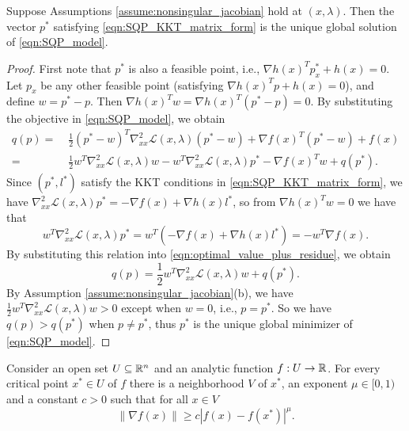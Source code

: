 \documentclass[11pt,a4paper]{article}
\begin{document}
\begin{prop}\label{prop:uniqueness_QP}
Suppose Assumptions \ref{assume:nonsingular_jacobian} hold at $(x,\lambda)$. Then the vector $p^*$ satisfying \eqref{eqn:SQP_KKT_matrix_form} is the unique global solution of \eqref{eqn:SQP_model}.
\end{prop}

\begin{proof}
First note that $p^*$ is also a feasible point, i.e., $\nabla h(x)^Tp^*_x + h(x) = 0$. Let $p_x$ be any other feasible point (satisfying $\nabla h(x)^Tp + h(x) = 0$), and define $w = p^*-p$. Then $\nabla h(x)^Tw = \nabla h(x)^T(p^*-p) = 0$. By substituting the objective in \eqref{eqn:SQP_model}, we obtain
\begin{align}
q(p) =&\; \frac{1}{2}(p^*-w)^T\nabla_{xx}^2\mathcal{L}(x,\lambda)(p^*-w)+\nabla f(x)^T(p^*-w)+f(x)\nonumber \\
=&\; \frac{1}{2}w^T\nabla_{xx}^2\mathcal{L}(x,\lambda)w - w^T\nabla_{xx}^2\mathcal{L}(x,\lambda)p^* - \nabla f(x)^Tw + q(p^*).\label{eqn:optimal_value_plus_residue}
\end{align}
Since $(p^*,l^*)$ satisfy the KKT conditions in \eqref{eqn:SQP_KKT_matrix_form}, we have $\nabla_{xx}^2\mathcal{L}(x,\lambda)p^* = -\nabla f(x)+\nabla h(x)l^*$, so from $\nabla h(x)^Tw = 0$ we have that
\begin{equation*}
w^T\nabla_{xx}^2\mathcal{L}(x,\lambda)p^* = w^T(-\nabla f(x)+\nabla h(x)l^*) = -w^T\nabla f(x).
\end{equation*}
By substituting this relation into \eqref{eqn:optimal_value_plus_residue}, we obtain
\begin{equation*}
q(p) = \frac{1}{2}w^T\nabla_{xx}^2\mathcal{L}(x,\lambda)w + q(p^*).
\end{equation*}
By Assumption \ref{assume:nonsingular_jacobian}(b), we have $\frac{1}{2}w^T\nabla_{xx}^2\mathcal{L}(x,\lambda)w>0$ except when $w = 0$, i.e., $p = p^*$. So we have $q(p)>q(p^*)$ when $p\neq p^*$, thus $p^*$ is the unique global minimizer of \eqref{eqn:SQP_model}.
\end{proof}

\begin{prop} \label{prop:Lojasiewicz_inequality}
Consider an open set $U\subseteq \mathbb{R}^n$ and an analytic function $f:U\rightarrow \mathbb{R}$. For every critical point $x^*\in U$ of $f$ there is a neighborhood $V$ of $x^*$, an exponent $\mu\in [0,1)$ and a constant $c>0$ such that for all $x\in V$
\begin{equation*}
\|\nabla f(x)\| \ge c|f(x) - f(x^*)|^\mu.
\end{equation*}
\end{prop}
\end{document}
